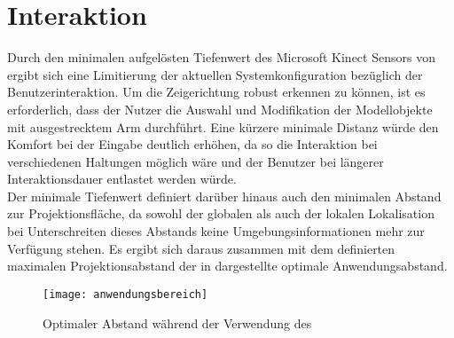 \section{Interaktion}
Durch den minimalen aufgelösten Tiefenwert des Microsoft Kinect Sensors von \red[ABSTAND 0,5m?] ergibt sich eine Limitierung der aktuellen Systemkonfiguration bezüglich der Benutzerinteraktion. Um die Zeigerichtung robust erkennen zu können, ist es erforderlich, dass der Nutzer die Auswahl und Modifikation der Modellobjekte mit ausgestrecktem Arm durchführt. Eine kürzere minimale Distanz würde den Komfort bei der Eingabe deutlich erhöhen, da so die Interaktion bei verschiedenen Haltungen möglich wäre und der Benutzer bei längerer Interaktionsdauer entlastet werden würde.\\

Der minimale Tiefenwert definiert darüber hinaus auch den minimalen Abstand zur Projektionsfläche, da sowohl der globalen als auch der lokalen Lokalisation bei Unterschreiten dieses Abstands keine Umgebungsinformationen mehr zur Verfügung stehen. Es ergibt sich daraus zusammen mit dem definierten maximalen Projektionsabstand der in  dargestellte optimale Anwendungsabstand.\\

\begin{figure}[!ht]
	\begin{center}
		\texttt{[image: anwendungsbereich]}
		\caption{Optimaler Abstand während der Verwendung des }
		\label{fig.optdist}
	\end{center}
\end{figure}





